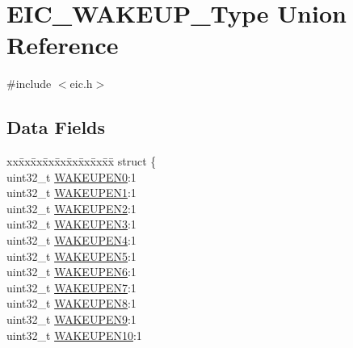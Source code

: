 \hypertarget{union_e_i_c___w_a_k_e_u_p___type}{}\section{E\+I\+C\+\_\+\+W\+A\+K\+E\+U\+P\+\_\+\+Type Union Reference}
\label{union_e_i_c___w_a_k_e_u_p___type}


{\ttfamily \#include $<$eic.\+h$>$}

\subsection*{Data Fields}
\begin{DoxyCompactItemize}
\item 
\begin{tabbing}
xx\=xx\=xx\=xx\=xx\=xx\=xx\=xx\=xx\=\kill
struct \{\\
\>uint32\_t \mbox{\hyperlink{union_e_i_c___w_a_k_e_u_p___type_a0322dbcd85e1ef28125b69bba27e038a}{WAKEUPEN0}}:1\\
\>uint32\_t \mbox{\hyperlink{union_e_i_c___w_a_k_e_u_p___type_a0105ad3262511c03bcad25251f3e666b}{WAKEUPEN1}}:1\\
\>uint32\_t \mbox{\hyperlink{union_e_i_c___w_a_k_e_u_p___type_a1636d47f70191bb066012c74af7ad839}{WAKEUPEN2}}:1\\
\>uint32\_t \mbox{\hyperlink{union_e_i_c___w_a_k_e_u_p___type_a4c9619fe3bf7f0edb29f8164bf30b608}{WAKEUPEN3}}:1\\
\>uint32\_t \mbox{\hyperlink{union_e_i_c___w_a_k_e_u_p___type_a2cf32de802b332c0aabbc0580b8cbacc}{WAKEUPEN4}}:1\\
\>uint32\_t \mbox{\hyperlink{union_e_i_c___w_a_k_e_u_p___type_a0a0c79b5c8d622542c0b6a307aae5118}{WAKEUPEN5}}:1\\
\>uint32\_t \mbox{\hyperlink{union_e_i_c___w_a_k_e_u_p___type_a30d601274992c8135e0d6bace25c4804}{WAKEUPEN6}}:1\\
\>uint32\_t \mbox{\hyperlink{union_e_i_c___w_a_k_e_u_p___type_a5afd682340c7d0cab259885be26c1bed}{WAKEUPEN7}}:1\\
\>uint32\_t \mbox{\hyperlink{union_e_i_c___w_a_k_e_u_p___type_aec0b88fa9f0fb7eaf34b464a7d4275af}{WAKEUPEN8}}:1\\
\>uint32\_t \mbox{\hyperlink{union_e_i_c___w_a_k_e_u_p___type_a6f2b5b327b9c0ec523cc796f54fb77c6}{WAKEUPEN9}}:1\\
\>uint32\_t \mbox{\hyperlink{union_e_i_c___w_a_k_e_u_p___type_ad040a673c8dc1a76ebad173219c82840}{WAKEUPEN10}}:1\\

\end{tabbing}
\end{DoxyCompactItemize}

